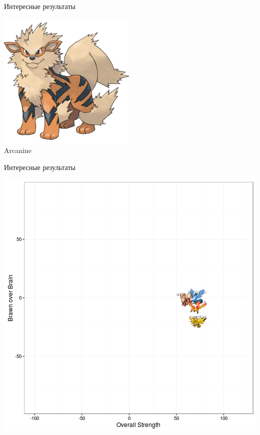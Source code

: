 \documentclass[10pt]{beamer}
\begin{document}
{
\begin{frame}{Интересные результаты}
	\begin{center}
	  	\includegraphics[keepaspectratio = true]{images/Arcanine}  \\
	  	Arcanine
	\end{center}
\end{frame}

\begin{frame}{Интересные результаты}
	\begin{center}
	  \includegraphics[width= \textwidth, height=0.8 \textheight, keepaspectratio = true]{images/legendary_arcanine}  
	\end{center}
\end{frame}
}
\end{document}
